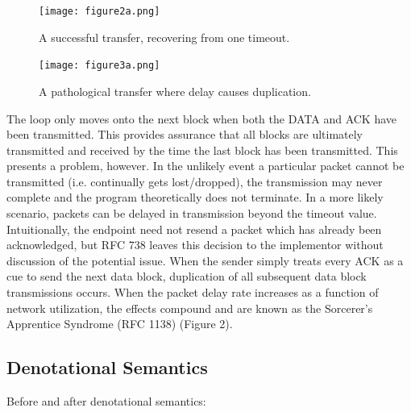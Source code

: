 \documentclass[a0,landscape]{a0poster}
\begin{document}
\begin{multicols}{4}
\begin{minipage}{\linewidth}
\centering
  \begin{minipage}{0.45\linewidth}
    \centering
    \begin{figure}[H]
    \centering
      \texttt{[image: figure2a.png]}
      \caption{A successful transfer, recovering from one timeout.}
    \end{figure}
  \end{minipage}
  \begin{minipage}{0.45\linewidth}
    \centering
    \begin{figure}[H]
    \centering
      \texttt{[image: figure3a.png]}
      \caption{A pathological transfer where delay causes duplication.}
    \end{figure}
  \end{minipage}
\end{minipage}

The loop only moves onto the next block when both the DATA and ACK have been transmitted. This provides assurance that all blocks are ultimately transmitted and received by the time the last block has been transmitted. This presents a problem, however. In the unlikely event a particular packet cannot be transmitted (i.e. continually gets lost/dropped), the transmission may never complete and the program theoretically does not terminate. In a more likely scenario, packets can be delayed in transmission beyond the timeout value. Intuitionally, the endpoint need not resend a packet which has already been acknowledged, but RFC 738 leaves this decision to the implementor without discussion of the potential issue. When the sender simply treats every ACK as a cue to send the next data block, duplication of all subsequent data block transmissions occurs. When the packet delay rate increases as a function of network utilization, the effects compound and are known as the Sorcerer's Apprentice Syndrome (RFC 1138) (Figure 2).


\subsection*{Denotational Semantics}

Before and after denotational semantics:


\end{multicols}
\end{document}
